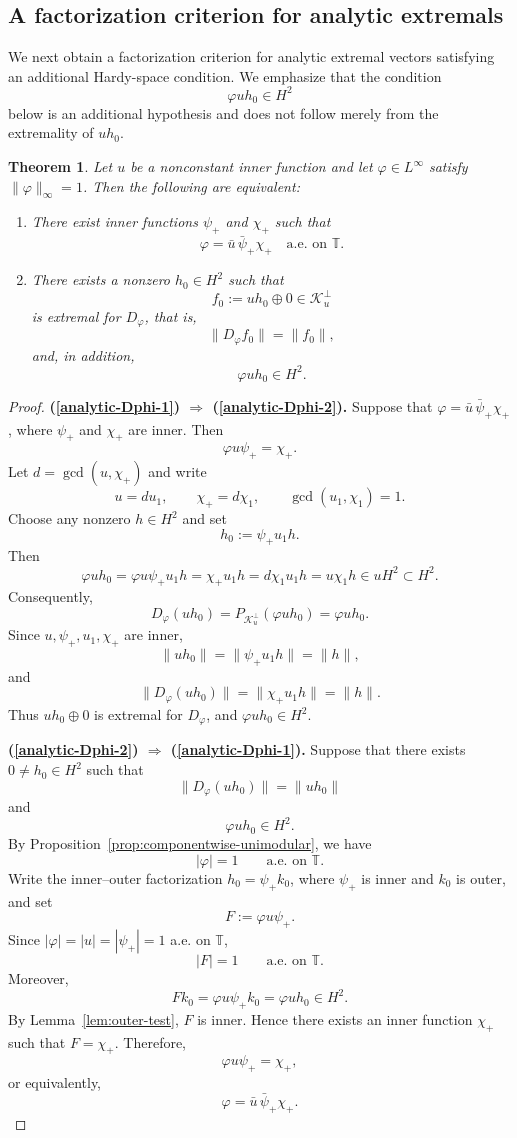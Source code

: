 \documentclass[12pt]{amsart}
\newtheorem{theorem}{Theorem}[section]
\theoremstyle{definition}
\theoremstyle{remark}
\def \T{\mathbb{T}}
\newcommand{\clk}{\mathcal{K}}
\newcommand{\vp}{\varphi}
\numberwithin{equation}{section}
\begin{document}
\subsection{A factorization criterion for analytic extremals}

We next obtain a factorization criterion for analytic extremal
vectors satisfying an additional Hardy-space condition. We emphasize
that the condition
\[
\vp u h_0\in H^2
\]
below is an additional hypothesis and does not follow merely from
the extremality of $uh_0$.

\begin{theorem}\label{thm:analytic-Dphi}
Let $u$ be a nonconstant inner function and let $\vp\in L^\infty$ satisfy $\|\vp\|_\infty=1$. Then the following are equivalent:
\begin{enumerate}
\item\label{analytic-Dphi-1}
There exist inner functions $\psi_{+}$ and $\chi_{+}$ such that
\[
\vp=\bar{u}\,\bar{\psi}_{+}\chi_{+}\quad \text{a.e. on }\T.
\]
		
\item\label{analytic-Dphi-2}
There exists a nonzero $h_0\in H^2$ such that
\[
f_0:=uh_0\oplus0\in\clk_u^\perp
\]
is extremal for $D_\vp$, that is,
\[
\|D_\vp f_0\|=\|f_0\|,
\]
and, in addition,
\[
\vp uh_0\in H^2.
\]
\end{enumerate}
\end{theorem}

\begin{proof}
\textbf{(\ref{analytic-Dphi-1}) $\Rightarrow$ (\ref{analytic-Dphi-2}).}
Suppose that $\vp=\bar{u}\,\bar{\psi}_{+}\chi_{+}$, where $\psi_{+}$ and $\chi_{+}$ are inner. Then
\[
\vp u\psi_{+}=\chi_{+}.
\]
Let $d=\gcd(u,\chi_{+})$ and write
\[
u=du_1,\qquad\chi_{+}=d\chi_1,\qquad\gcd(u_1,\chi_1)=1.
\]
Choose any nonzero $h\in H^2$ and set
\[
h_0:=\psi_{+}u_1h.
\]
Then
\[
\vp uh_0 =\vp u\psi_{+}u_1h=\chi_{+}u_1h=d\chi_1u_1h=u\chi_1h
\in uH^2\subset H^2.
\]
Consequently,
\[
D_\vp(uh_0)=P_{\clk_u^\perp}(\vp uh_0)=\vp uh_0.
\]
Since $u,\psi_{+},u_1,\chi_{+}$ are inner,
\[
\|uh_0\|=\|\psi_{+}u_1h\|=\|h\|,
	\]
and
\[
\|D_\vp(uh_0)\|=\|\chi_{+}u_1h\|=\|h\|.
\]
Thus $uh_0\oplus0$ is extremal for $D_\vp$, and $\vp uh_0\in H^2$.
	
	\medskip
	
\textbf{(\ref{analytic-Dphi-2}) $\Rightarrow$
		(\ref{analytic-Dphi-1}).}
Suppose that there exists $0\neq h_0\in H^2$ such that
\[
\|D_\vp(uh_0)\|=\|uh_0\|
\]
and
\[
\vp uh_0\in H^2.
\]
By Proposition~\ref{prop:componentwise-unimodular}, we have
\[
|\vp|=1\qquad\text{a.e. on }\T.
\]
Write the inner--outer factorization $h_0=\psi_{+}k_0$,
where $\psi_{+}$ is inner and $k_0$ is outer, and set
\[
F:=\vp u\psi_{+}.
\]
Since $|\vp|=|u|=|\psi_{+}|=1$ a.e. on $\T$,
\[
|F|=1\qquad\text{a.e. on }\T.
\]
Moreover,
\[
Fk_0=\vp u\psi_{+}k_0=\vp uh_0\in H^2.
\]
By Lemma~\ref{lem:outer-test}, $F$ is inner. Hence there exists an inner function $\chi_{+}$ such that $F=\chi_{+}$. Therefore,
\[
\vp u\psi_{+}=\chi_{+},
\]
or equivalently,
\[
\vp=\bar{u}\,\bar{\psi}_{+}\chi_{+}.
\]
\end{proof}
\end{document}
